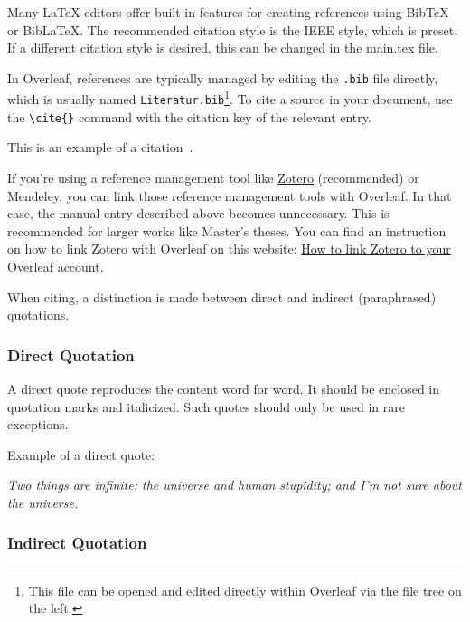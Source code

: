 \documentclass[a4paper, fleqn, headsepline, footsepline, 12pt, parskip=half]{scrartcl}
\begin{document}
Many LaTeX editors offer built-in features for creating references using BibTeX or BibLaTeX. The recommended citation style is the IEEE style, which is preset. If a different citation style is desired, this can be changed in the main.tex file.

In Overleaf, references are typically managed by editing the \texttt{.bib} file directly, which is usually named \texttt{Literatur.bib}\footnote{This file can be opened and edited directly within Overleaf via the file tree on the left.}. To cite a source in your document, use the \verb|\cite{}| command with the citation key of the relevant entry.

This is an example of a citation~\cite{Hunt2019}.

If you're using a reference management tool like \href{https://www.zotero.org}{Zotero} (recommended) or Mendeley, you can link those reference management tools with Overleaf. In that case, the manual entry described above becomes unnecessary. This is recommended for larger works like Master's theses. You can find an instruction on how to link Zotero with Overleaf on this website: \href{https://www.overleaf.com/learn/how-to/How_to_link_Zotero_to_your_Overleaf_account}{How to link Zotero to your Overleaf account}.

When citing, a distinction is made between direct and indirect (paraphrased) quotations.


\subsubsection{Direct Quotation}
\label{sec:directQuotation}

A direct quote reproduces the content word for word. It should be enclosed in quotation marks and italicized. Such quotes should only be used in rare exceptions.

Example of a direct quote:

\begin{center}
		{\glqq}\textit{Two things are infinite: the universe and human stupidity; and I'm not sure about the universe.}{\grqq} \cite{Einstein1941}
\end{center}


\subsubsection{Indirect Quotation}
\label{sec:indirectQuotation}
\end{document}

